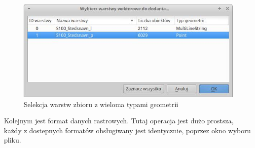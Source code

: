 \documentclass[12pt,a4paper]{book}
\begin{document}
\begin{figure}[ht]
	\centering
	\includegraphics[height=5cm]{002-typ-geometrii.jpg}
	\caption{Selekcja warstw zbioru z wieloma typami geometrii}
\end{figure}

Kolejnym jest format danych rastrowych. Tutaj operacja jest dużo prostsza, każdy z dostepnych formatów obsługiwany jest identycznie, poprzez okno wyboru pliku.
\end{document}
